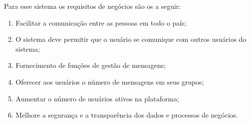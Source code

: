 Para esse sistema os requisitos de negócios são os a seguir:
\vspace{1em}
\begin{enumerate}
  \item Facilitar a comunicação entre as pessoas em todo o país;
  \item O sistema deve permitir que o usuário se comunique com outros usuários do sistema;
  \item Fornecimento de funções de gestão de mensagens;
  \item Oferecer aos usuários o número de mensagens em seus grupos;
  \item Aumentar o número de usuários ativos na plataforma;
  \item Melhore a segurança e a transparência dos dados e processos de negócios.
\end{enumerate}
